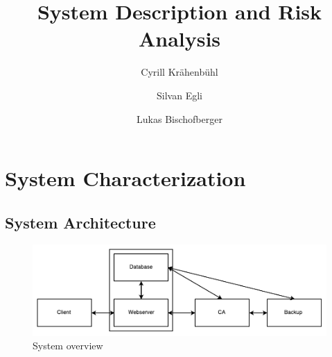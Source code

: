 \documentclass[english]{article}
\title{\huge\sffamily\bfseries System Description and Risk Analysis}
\author{Cyrill Krähenbühl \and Silvan Egli \and Lukas Bischofberger }
\date{}
\begin{document}
\maketitle

\begin{center}
\end{center}

\tableofcontents
\pagebreak


\section{System Characterization}

\subsection{System Architecture}

\begin{figure}[ht]
	\centering
	\includegraphics[scale=0.7]{seclabsystemoverview.pdf}
	\caption{System overview}
\end{figure}








\end{document}
